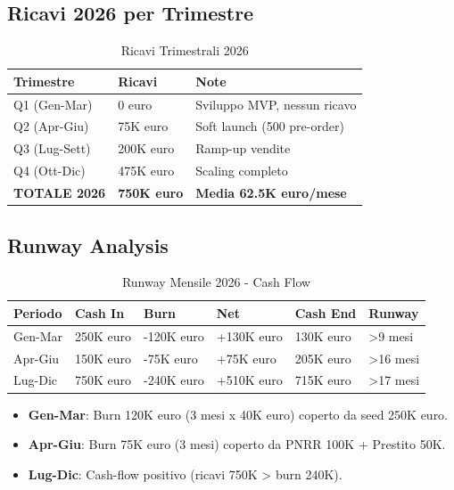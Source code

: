 \documentclass[11pt,a4paper]{report}
\begin{document}
\subsection{Ricavi 2026 per Trimestre}
\begin{table}[H]
\centering
\caption{Ricavi Trimestrali 2026}
\label{tab:quarterly-revenue}
\begin{tabular}{L{2cm} C{2cm} C{2.5cm}}
\toprule
{\bf Trimestre} & {\bf Ricavi} & {\bf Note} \\
\midrule
Q1 (Gen-Mar) & 0 euro & Sviluppo MVP, nessun ricavo \\
Q2 (Apr-Giu) & 75K euro & Soft launch (500 pre-order) \\
Q3 (Lug-Sett) & 200K euro & Ramp-up vendite \\
Q4 (Ott-Dic) & 475K euro & Scaling completo \\
\midrule
{\bf TOTALE 2026} & {\bf 750K euro} & {\bf Media 62.5K euro/mese} \\
\bottomrule
\end{tabular}
\end{table}

\subsection{Runway Analysis}
\begin{table}[H]
\centering
\caption{Runway Mensile 2026 - Cash Flow}
\label{tab:runway-monthly}
\begin{tabular}{L{2cm} C{1.8cm} C{1.8cm} C{1.8cm} C{1.8cm} C{1.5cm}}
\toprule
{\bf Periodo} & {\bf Cash In} & {\bf Burn} & {\bf Net} & {\bf Cash End} & {\bf Runway} \\
\midrule
Gen-Mar & 250K euro & -120K euro & +130K euro & 130K euro & >9 mesi \\
Apr-Giu & 150K euro & -75K euro & +75K euro & 205K euro & >16 mesi \\
Lug-Dic & 750K euro & -240K euro & +510K euro & 715K euro & >17 mesi \\
\bottomrule
\end{tabular}
\end{table}

\begin{itemize}
\item {\bf Gen-Mar}: Burn 120K euro (3 mesi x 40K euro) coperto da seed 250K euro.
\item {\bf Apr-Giu}: Burn 75K euro (3 mesi) coperto da PNRR 100K + Prestito 50K.
\item {\bf Lug-Dic}: Cash-flow positivo (ricavi 750K > burn 240K).
\end{itemize}
\end{document}
